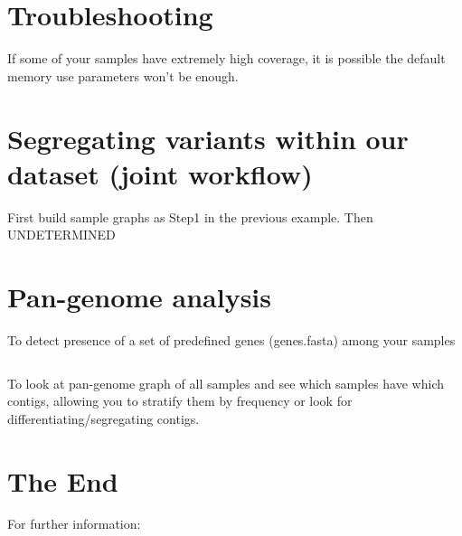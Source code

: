 \documentclass[a4paper,9pt]{extarticle}
\begin{document}
\begin{multicols*}{2}
\section{Troubleshooting}
If some of your samples have extremely high coverage, it is possible the default memory use parameters won't be enough. 


\section{Segregating variants within our dataset (joint workflow)}
First build sample graphs as Step1 in the previous example. Then UNDETERMINED



\section{Pan-genome analysis}

To detect presence of a set of predefined genes (genes.fasta) among your samples
\begin{verbatim}
\end{verbatim}
To look at pan-genome graph of all samples and see which samples have which contigs, allowing you to stratify them by frequency or look for differentiating/segregating contigs.


\section{The End}

For further information:


\end{multicols*}
\end{document}
